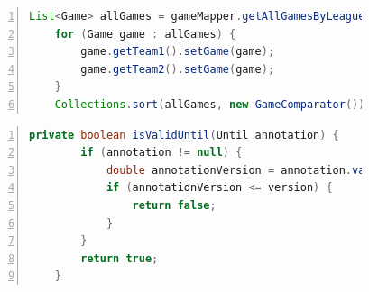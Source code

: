 \begin{figure}[ht]
\centering
\begin{lrbox}{\partiallisting}
\begin{minipage}{0.4\textwidth}
\begin{lstlisting}[basicstyle=\scriptsize\sffamily, stepnumber=1, numbers=left, numbersep=-6pt, framexleftmargin=0mm, framexrightmargin=0mm, language=Java, emph={allGames}]
    List<Game> allGames = gameMapper.getAllGamesByLeague(league);
    for (Game game : allGames) {
        game.getTeam1().setGame(game);
        game.getTeam2().setGame(game);
    }
    Collections.sort(allGames, new GameComparator());
\end{lstlisting}
\vspace{0.55cm}
\end{minipage}
\end{lrbox}
\usebox{\partiallisting}
\begin{lrbox}{\complisting}
\begin{minipage}{0.4\textwidth}
\begin{lstlisting}[basicstyle=\scriptsize\sffamily, stepnumber=1, numbers=left, numbersep=-6pt, framexleftmargin=0mm, framexrightmargin=0mm, language=java, emph={annotationVersion}]
    private boolean isValidUntil(Until annotation) {
        if (annotation != null) {
            double annotationVersion = annotation.value();
            if (annotationVersion <= version) {
                return false;
            }
        }
        return true;
    }
    \end{lstlisting}
\end{minipage}
\end{lrbox}
\usebox{\complisting}


\end{figure}
